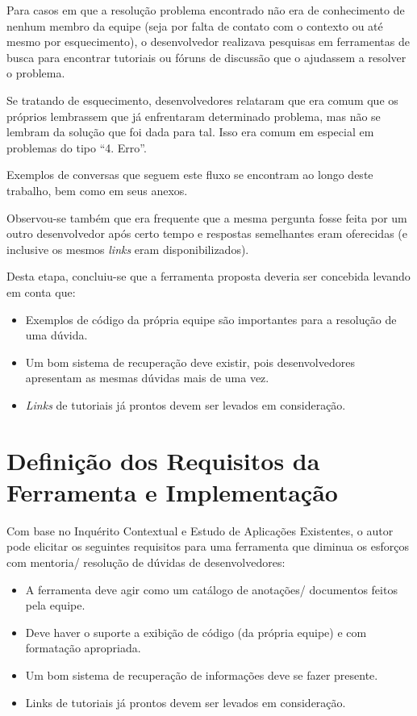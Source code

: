 Para casos em que a resolução problema encontrado não era de conhecimento de nenhum membro da equipe (seja por falta de contato com o contexto ou até mesmo por esquecimento), o desenvolvedor realizava pesquisas em ferramentas de busca para encontrar tutoriais ou fóruns de discussão que o ajudassem a resolver o problema.

Se tratando de esquecimento, desenvolvedores relataram que era comum que os próprios lembrassem que já enfrentaram determinado problema, mas não se lembram da solução que foi dada para tal. Isso era comum em especial em problemas do tipo ``4. Erro''.

Exemplos de conversas que seguem este fluxo se encontram ao longo deste trabalho, bem como em seus anexos.

Observou-se também que era frequente que a mesma pergunta fosse feita por um outro desenvolvedor após certo tempo e respostas semelhantes eram oferecidas (e inclusive os mesmos \textit{links} eram disponibilizados).

Desta etapa, concluiu-se que a ferramenta proposta deveria ser concebida levando em conta que:

\begin{itemize}
  \item Exemplos de código da própria equipe são importantes para a resolução de uma dúvida.
  \item Um bom sistema de recuperação deve existir, pois desenvolvedores apresentam as mesmas dúvidas mais de uma vez.
  \item \textit{Links} de tutoriais já prontos devem ser levados em consideração.
\end{itemize}

\section{Definição dos Requisitos da Ferramenta e Implementação}

Com base no Inquérito Contextual e Estudo de Aplicações Existentes, o autor pode elicitar os seguintes requisitos para uma ferramenta que diminua os esforços com mentoria/ resolução de dúvidas de desenvolvedores:

\begin{itemize}
  \item A ferramenta deve agir como um catálogo de anotações/ documentos feitos pela equipe.
  \item Deve haver o suporte a exibição de código (da própria equipe) e com formatação apropriada.
  \item Um bom sistema de recuperação de informações deve se fazer presente.
  \item Links de tutoriais já prontos devem ser levados em consideração.
\end{itemize}

